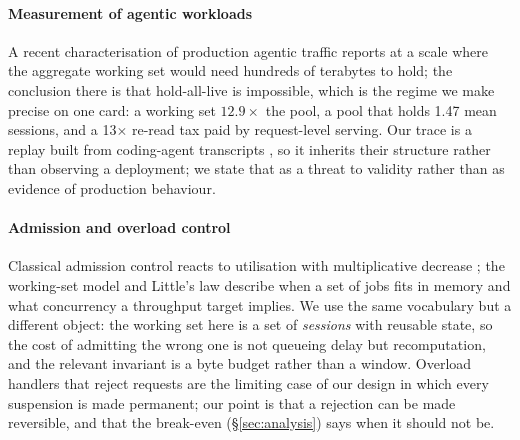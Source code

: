 \paragraph{Measurement of agentic workloads} A recent characterisation of production
agentic traffic reports
at a scale where the aggregate working set would need hundreds of terabytes to hold; the
conclusion there is that hold-all-live is impossible, which is the regime we make precise on
one card: a working set $12.9\times$ the pool, a pool that holds 1.47 mean sessions, and a
13$\times$ re-read tax paid by request-level serving. Our trace is a replay built from
coding-agent transcripts \cite{zhu2026tracelab}, so it inherits their structure rather than
observing a deployment; we state that as a threat to validity rather than as evidence of
production behaviour.

\paragraph{Admission and overload control} Classical admission control reacts to
utilisation with multiplicative decrease \cite{jacobson1988}; the working-set model
\cite{denning1978} and Little's law \cite{little1961} describe when a set of jobs fits in
memory and what concurrency a throughput target implies. We use the same vocabulary but a
different object: the working set here is a set of \emph{sessions} with reusable state, so
the cost of admitting the wrong one is not queueing delay but recomputation, and the
relevant invariant is a byte budget rather than a window. Overload handlers that reject
requests \cite{mooncake} are the limiting case of our design in which every suspension is
made permanent; our point is that a rejection can be made reversible, and that the
break-even (\S\ref{sec:analysis}) says when it should not be.
